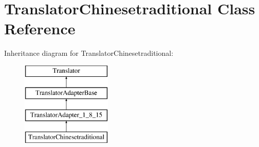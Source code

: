 \hypertarget{class_translator_chinesetraditional}{}\section{Translator\+Chinesetraditional Class Reference}
\label{class_translator_chinesetraditional}
Inheritance diagram for Translator\+Chinesetraditional\+:\begin{figure}[H]
\begin{center}
\leavevmode
\includegraphics[height=4.000000cm]{class_translator_chinesetraditional}
\end{center}
\end{figure}
